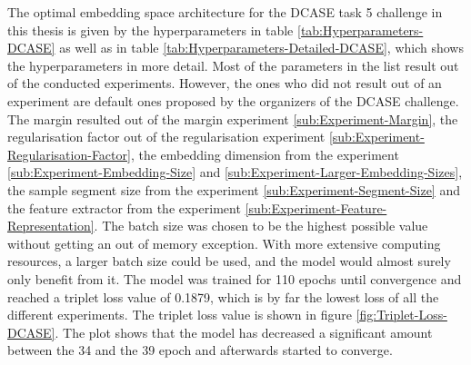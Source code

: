 \noindent
The optimal embedding space architecture for the \gls{DCASE} task 5 challenge in this thesis is given by the hyperparameters in table \ref{tab:Hyperparameters-DCASE} as well as in table \ref{tab:Hyperparameters-Detailed-DCASE}, which shows the hyperparameters in more detail. Most of the parameters in the list result out of the conducted experiments. However, the ones who did not result out of an experiment are default ones proposed by the organizers of the \gls{DCASE} challenge. The margin resulted out of the margin experiment \ref{sub:Experiment-Margin}, the regularisation factor out of the regularisation experiment \ref{sub:Experiment-Regularisation-Factor}, the embedding dimension from the experiment \ref{sub:Experiment-Embedding-Size} and \ref{sub:Experiment-Larger-Embedding-Sizes}, the sample segment size from the experiment \ref{sub:Experiment-Segment-Size} and the feature extractor from the experiment \ref{sub:Experiment-Feature-Representation}. The batch size was chosen to be the highest possible value without getting an out of memory exception. With more extensive computing resources, a larger batch size could be used, and the model would almost surely only benefit from it.
\newline
\newline
The model was trained for 110 epochs until convergence and reached a triplet loss value of 0.1879, which is by far the lowest loss of all the different experiments. The triplet loss value is shown in figure \ref{fig:Triplet-Loss-DCASE}. The plot shows that the model has decreased a significant amount between the 34 and the 39 epoch and afterwards started to converge.

